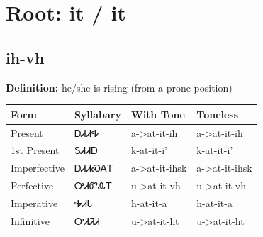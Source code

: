 \documentclass{article}%
\begin{document}
%
\normalsize%
\section*{Root: it / it}%
\subsection*{ih-vh}%
\textbf{Definition: }%
he/she is rising (from a prone position)%
\\[0.5em]%
\begin{tabular}{|l|l|l|l|}%
\hline%
\textbf{Form}&\textbf{Syllabary}&\textbf{With Tone}&\textbf{Toneless}\\%
\hline%
Present&ᎠᏗᏗᎭ&a{-}>at{-}it{-}ih&a{-}>at{-}it{-}ih\\%
1st Present&ᎦᏗᏗᎠ&k{-}at{-}it{-}i'&k{-}at{-}it{-}i'\\%
Imperfective&ᎠᏗᏗᏍᎪᎢ&a{-}>at{-}it{-}ihsk&a{-}>at{-}it{-}ihsk\\%
Perfective&ᎤᏗᏛᎲᎢ&u{-}>at{-}it{-}vh&u{-}>at{-}it{-}vh\\%
Imperative&ᎭᏗᏓ&h{-}at{-}it{-}a&h{-}at{-}it{-}a\\%
Infinitive&ᎤᏗᏘᏗ&u{-}>at{-}it{-}ht&u{-}>at{-}it{-}ht\\%
\hline%
\end{tabular}%
\\[1em]%
\end{document}

